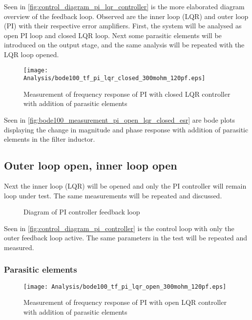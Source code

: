 Seen in \autoref{fig:control_diagram_pi_lqr_controller} is the more elaborated diagram overview of the feedback loop. Observed are the inner loop (LQR) and outer loop (PI) with their respective error amplifiers. First, the system will be analysed as open PI loop and closed LQR loop. Next some parasitic elements will be introduced on the output stage, and the same analysis will be repeated with the LQR loop opened.


\begin{figure}[H]
	\centering
	\texttt{[image: Analysis/bode100\_tf\_pi\_lqr\_closed\_300mohm\_120pf.eps]}
	\caption{Measurement of frequency response of PI with closed LQR controller with addition of parasitic elements}
	\label{fig:bode100_measurement_pi_open_lqr_closed_esr}
\end{figure}
Seen in \autoref{fig:bode100_measurement_pi_open_lqr_closed_esr} are bode plots displaying the change in magnitude and phase response with addition of parasitic elements in the filter inductor. 

\subsection{Outer loop open, inner loop open}
Next the inner loop (LQR) will be opened and only the PI controller will remain loop under test. The same measurements will be repeated and discussed.

\begin{figure}[H]
	\centering
	
	\caption{Diagram of PI controller feedback loop}
	\label{fig:control_diagram_pi_controller}
\end{figure}
Seen in \autoref{fig:control_diagram_pi_controller} is the control loop with only the outer feedback loop active. The same parameters in the test will be repeated and measured. 
\subsubsection{Parasitic elements}
\begin{figure}[H]
	\centering
	\texttt{[image: Analysis/bode100\_tf\_pi\_lqr\_open\_300mohm\_120pf.eps]}
	\caption{Measurement of frequency response of PI with open LQR controller with addition of parasitic elements}
	\label{fig:bode100_measurement_pi_open_lqr_open_esr}
\end{figure}

